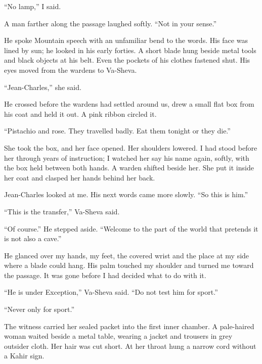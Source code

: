 ``No lamp,'' I said.\par

A man farther along the passage laughed softly. ``Not in your sense.''\par

He spoke Mountain speech with an unfamiliar bend to the words. His face was lined by sun; he looked in his early forties. A short blade hung beside metal tools and black objects at his belt. Even the pockets of his clothes fastened shut. His eyes moved from the wardens to Va-Sheva.\par

``Jean-Charles,'' she said.\par

He crossed before the wardens had settled around us, drew a small flat box from his coat and held it out. A pink ribbon circled it.\par

``Pistachio and rose. They travelled badly. Eat them tonight or they die.''\par

She took the box, and her face opened. Her shoulders lowered. I had stood before her through years of instruction; I watched her say his name again, softly, with the box held between both hands. A warden shifted beside her. She put it inside her coat and clasped her hands behind her back.\par

Jean-Charles looked at me. His next words came more slowly. ``So this is him.''\par

``This is the transfer,'' Va-Sheva said.\par

``Of course.'' He stepped aside. ``Welcome to the part of the world that pretends it is not also a cave.''\par

He glanced over my hands, my feet, the covered wrist and the place at my side where a blade could hang. His palm touched my shoulder and turned me toward the passage. It was gone before I had decided what to do with it.\par

``He is under Exception,'' Va-Sheva said. ``Do not test him for sport.''\par

``Never only for sport.''\par

The witness carried her sealed packet into the first inner chamber. A pale-haired woman waited beside a metal table, wearing a jacket and trousers in grey outsider cloth. Her hair was cut short. At her throat hung a narrow cord without a Kahir sign.\par

